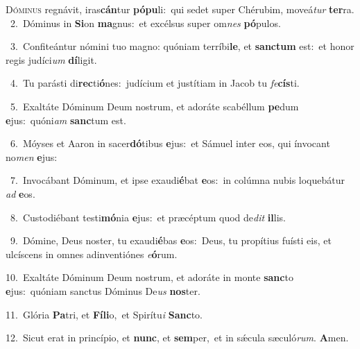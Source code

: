 \lettrine{\initial\textcolor{\initialcolor}{D}}{óminus} regnávit, iras\-\textbf{cán}\-tur \textbf{pó}\-\textbf{pu}li:~\star qui sedet super Chérubim, moveá\textit{tur} \textbf{ter}\-ra.\\
{\numbfont\textcolor{\numbcolor}{~2.}}~Dóminus in \textbf{Si}\-on \textbf{ma}\-gnus:~\star et excélsus super om\textit{nes} \textbf{pó}\-pulos.\par
{\numbfont\textcolor{\numbcolor}{~3.}}~Confiteántur nómini tuo magno: quóniam terríbi\-\textbf{le}\-, et \textbf{sanc}\-\textbf{tum} est:~\star et honor regis judíci\textit{um} \textbf{dí}\-ligit.\par
{\numbfont\textcolor{\numbcolor}{~4.}}~Tu parásti di\-\textbf{rec}\-ti\-\textbf{ó}\-nes:~\star judícium et justítiam in Jacob tu \textit{fe}\-\textbf{cís}ti.\par
{\numbfont\textcolor{\numbcolor}{~5.}}~Exaltáte Dóminum Deum nostrum, et adoráte scabéllum \textbf{pe}\-dum \textbf{e}\-jus:~\star quóni\textit{am} \textbf{sanc}\-tum est.\par
{\numbfont\textcolor{\numbcolor}{~6.}}~Móyses et Aaron in sacer\-\textbf{dó}\-tibus \textbf{e}\-jus:~\star et Sámuel inter eos, qui ínvocant no\textit{men} \textbf{e}\-jus:\par
{\numbfont\textcolor{\numbcolor}{~7.}}~Invocábant Dóminum, et ipse exaudi\-\textbf{é}\-bat \textbf{e}\-os:~\star in colúmna nubis loquebátur \textit{ad} \textbf{e}\-os.\par
{\numbfont\textcolor{\numbcolor}{~8.}}~Custodiébant testi\-\textbf{mó}\-nia \textbf{e}\-jus:~\star et præcéptum quod de\textit{dit} \textbf{il}\-lis.\par
{\numbfont\textcolor{\numbcolor}{~9.}}~Dómine, Deus noster, tu exaudi\-\textbf{é}\-bas \textbf{e}\-os:~\star Deus, tu propítius fuísti eis, et ulcíscens in omnes adinventiónes \textit{e}\-\textbf{ó}rum.\par
{\numbfont\textcolor{\numbcolor}{10.}}~Exaltáte Dóminum Deum nostrum, et adoráte in monte \textbf{sanc}\-to \textbf{e}\-jus:~\star quóniam sanctus Dóminus De\textit{us} \textbf{nos}\-ter.\par
{\numbfont\textcolor{\numbcolor}{11.}}~Glória \textbf{Pa}\-tri, et \textbf{Fí}\-\textbf{li}o,~\star et Spirítu\textit{i} \textbf{Sanc}\-to.\par
{\numbfont\textcolor{\numbcolor}{12.}}~Sicut erat in princípio, et \textbf{nunc}\-, et \textbf{sem}\-per,~\star et in sǽcula sæculó\-\textit{rum}\-. \textbf{A}\-men.\par
